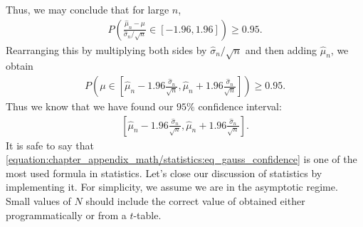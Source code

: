\documentclass[letterpaper,11pt,english]{sphinxmanual}
\begin{document}
Thus, we may conclude that for large \(n\),
\begin{equation}\label{equation:chapter_appendix_math/statistics:chapter_appendix_math/statistics:6}
\begin{split}P\left(\frac{\hat\mu_n - \mu}{\hat\sigma_n/\sqrt{n}} \in [-1.96, 1.96]\right) \ge 0.95.\end{split}
\end{equation}
Rearranging this by multiplying both sides by
\(\hat\sigma_n/\sqrt{n}\) and then adding \(\hat\mu_n\), we
obtain
\begin{equation}\label{equation:chapter_appendix_math/statistics:chapter_appendix_math/statistics:7}
\begin{split}P\left(\mu \in \left[\hat\mu_n - 1.96\frac{\hat\sigma_n}{\sqrt{n}}, \hat\mu_n + 1.96\frac{\hat\sigma_n}{\sqrt{n}}\right]\right) \ge 0.95.\end{split}
\end{equation}
Thus we know that we have found our \(95\%\) confidence interval:
\begin{equation}\label{equation:chapter_appendix_math/statistics:eq_gauss_confidence}
\begin{split}\left[\hat\mu_n - 1.96\frac{\hat\sigma_n}{\sqrt{n}}, \hat\mu_n + 1.96\frac{\hat\sigma_n}{\sqrt{n}}\right].\end{split}
\end{equation}
It is safe to say that \eqref{equation:chapter_appendix_math/statistics:eq_gauss_confidence} is one of the most
used formula in statistics. Let’s close our discussion of statistics by
implementing it. For simplicity, we assume we are in the asymptotic
regime. Small values of \(N\) should include the correct value of
 obtained either programmatically or from a \(t\)-table.
\end{document}
